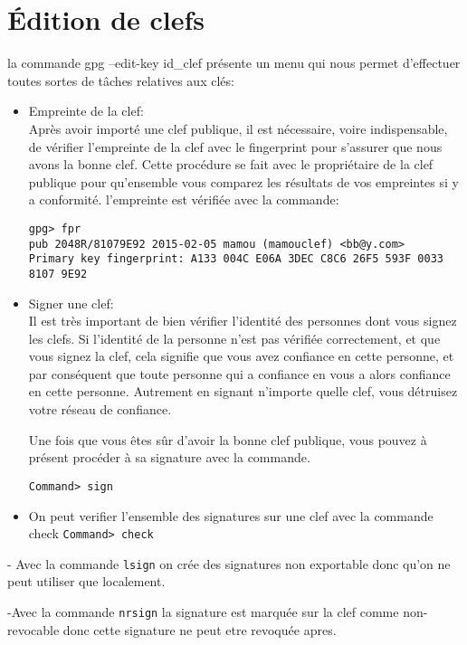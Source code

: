 \section{Édition de clefs}

la commande gpg --edit-key id\_clef
présente un menu qui nous permet d’effectuer toutes sortes de tâches relatives aux clés:\\
\begin{itemize}
\item Empreinte de la clef:\\

Après avoir importé une clef publique, il est nécessaire, voire indispensable, de vérifier l'empreinte de la clef avec le fingerprint 
pour s'assurer que nous avons la bonne clef. Cette procédure se fait avec le propriétaire de la clef publique pour qu'ensemble vous 
comparez les résultats de vos empreintes si y a conformité. l'empreinte est vérifiée avec la commande:

\texttt{gpg> fpr\\
pub   2048R/81079E92 2015-02-05 mamou (mamouclef) <bb@y.com>\\
 Primary key fingerprint: A133 004C E06A 3DEC C8C6  26F5 593F 0033 8107 9E92} \\

\item Signer une clef:\\
Il est très important de bien vérifier l'identité des personnes dont vous signez les clefs. Si l'identité de la personne n'est pas 
vérifiée correctement, et que vous signez la clef, cela signifie que vous avez confiance en cette personne, et par conséquent que 
toute personne qui a confiance en vous a alors confiance en cette personne. Autrement en signant n'importe quelle clef, vous détruisez
votre réseau de confiance.

Une fois que vous êtes sûr d'avoir la bonne clef publique, vous pouvez à présent procéder à sa signature avec la commande.

\texttt{Command> sign}

\item On peut verifier l'ensemble des signatures sur une clef avec la commande check
\texttt{Command> check }
\end{itemize}

- Avec la commande \texttt{lsign} on crée des signatures non exportable donc qu'on ne peut utiliser que localement.

-Avec la commande \texttt{nrsign} la signature est marquée sur la clef comme non-revocable donc cette signature ne peut etre revoquée apres.

